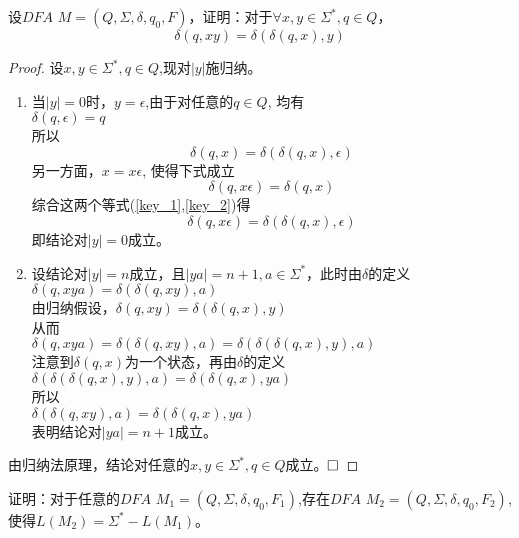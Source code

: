 \begin{exercise}
	设$DFA$ $M=(Q,\Sigma,\delta,q_0,F)$，证明：对于$\forall x,y\in\Sigma^\ast,q\in Q$，
	$$\delta(q,xy)=\delta(\delta(q,x),y)$$
\end{exercise}

\begin{solution}
	\begin{proof}
		设$x,y\in\Sigma^\ast,q\in Q$,现对$|y|$施归纳。
		\begin{enumerate}
			\item 当$|y|=0$时，$y=\epsilon$,由于对任意的$q\in Q$, 均有\\
			$\delta(q,\epsilon)=q$\\
			所以
			\begin{equation}\label{key_1}
			\delta(q,x)=\delta(\delta(q,x),\epsilon)
			\end{equation}
			另一方面，$x=x\epsilon$, 使得下式成立
			\begin{equation}\label{key_2}
			\delta(q,x\epsilon)=\delta(q,x)
			\end{equation}
			综合这两个等式(\ref{key_1},\ref{key_2})得
			$$\delta(q,x\epsilon)=\delta(\delta(q,x),\epsilon)$$
			即结论对$|y|=0$成立。
			
			\item 设结论对$|y|=n$成立，且$|ya|=n+1,a\in\Sigma^\ast$，此时由$\delta$的定义\\
			$\delta(q,xya)=\delta(\delta(q,xy),a)$\\
			由归纳假设，$\delta(q,xy)=\delta(\delta(q,x),y)$\\
			从而\\
			$\delta(q,xya)=\delta(\delta(q,xy),a)=\delta(\delta(\delta(q,x),y),a)$\\
			注意到$\delta(q,x)$为一个状态，再由$\delta$的定义\\
			$\delta(\delta(\delta(q,x),y),a)=\delta(\delta(q,x),ya)$\\
			所以\\
			$\delta(\delta(q,xy),a)=\delta(\delta(q,x),ya)$\\
			表明结论对$|ya|=n+1$成立。
		\end{enumerate}
		由归纳法原理，结论对任意的$x,y\in\Sigma^\ast,q\in Q$成立。$\hfill\square$
	\end{proof} 
\end{solution}

\begin{exercise}\label{ex:co}
	证明：对于任意的$DFA$ $M_1=(Q,\Sigma,\delta,q_0,F_1)$,存在$DFA$ $M_2=(Q,\Sigma,\delta,q_0,F_2)$,使得$L(M_2)=\Sigma^\ast-L(M_1)$。
\end{exercise}

